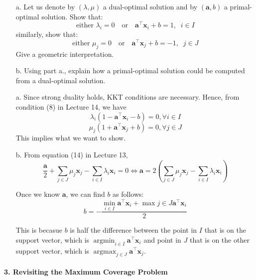 \documentclass[11pt]{article}
\theoremstyle{remark}
\DeclareMathOperator{\argmax}{argmax}
\DeclareMathOperator{\argmin}{argmin}
\newcommand{\bx}{\mathbf{x}}
\newcommand{\ba}{\mathbf{a}}
\begin{document}
\begin{itemize}
    \item[a.] Let us denote by $(\lambda, \mu)$ a dual-optimal solution and by
        $(\ba, b)$ a primal-optimal solution. Show that:
        \begin{displaymath}
            \text{either } \lambda_i = 0 \quad \mathrm{or} \quad \ba^\intercal
            \bx_i + b = 1,\;\; i\in I
        \end{displaymath}
        similarly, show that:
        \begin{displaymath}
            \text{either } \mu_j = 0 \quad \mathrm{or} \quad \ba^\intercal
            \bx_j + b = -1,\;\; j\in J
        \end{displaymath}
        Give a geometric interpretation.

    \item[b.] Using part a., explain how a primal-optimal solution could be
        computed from a dual-optimal solution.
\end{itemize}

\color{blue}
\begin{itemize}
\item[a.] Since strong duality holds, KKT conditions are necessary. Hence, from condition (8) in Lecture 14, we have 
$$\lambda_i(1-\ba^\intercal \bx_i-b) = 0, \forall i \in I $$
$$\mu_j(1+\ba^\intercal \bx_j+b) = 0, \forall j \in J $$
This implies what we want to show.

\item[b.] From equation (14) in Lecture 13, $$\frac{\ba}{2}+\sum_{j\in J} \mu_j \bx_j - \sum_{i\in I}\lambda_i \bx_i = 0 \Leftrightarrow \ba = 2(\sum_{j\in J} \mu_j \bx_j - \sum_{i\in I}\lambda_i \bx_i)$$

Once we know $\ba$, we can find $b$ as follows:
$$b=-\frac{\min_{i\in I}\ba^\intercal \bx_i + \max{j \in J}\ba^\intercal \bx_i}{2}$$

This is becasue $b$ is half the difference between the point in $I$ that is on the support vector, which is $\argmin_{i\in I}\ba^\intercal \bx_i$ and point in $J$ that is on the other support vector, which is $\argmax_{j\in J}\ba^\intercal \bx_j$.

\end{itemize}
\color{black}


\paragraph{3. Revisiting the Maximum Coverage Problem}
\end{document}
